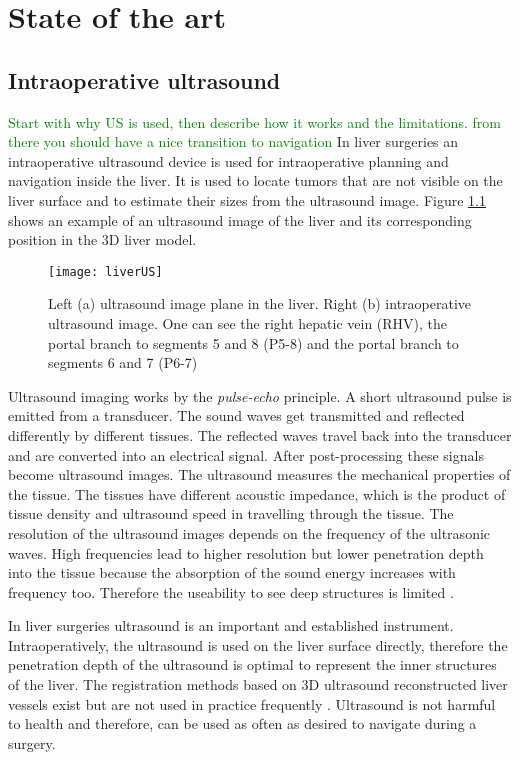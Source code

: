 \chapter{State of the art}

\section{Intraoperative ultrasound}
\textcolor{green}{Start with why US is used, then describe how it works and the limitations. from there you should have a nice transition to navigation}
In
liver surgeries an intraoperative ultrasound device is used for intraoperative planning and
navigation inside the liver. It is used to locate tumors that are not
visible on the liver surface and to estimate their sizes from the ultrasound image. Figure \ref{fig:liverUS} shows an example of an
ultrasound image of the liver and its corresponding position in the 3D liver
model.

\begin{figure}[H]
  \centering
 \texttt{[image: liverUS]}
 \caption{ Left (a) ultrasound image plane in the liver. Right (b) intraoperative
   ultrasound image. One can see the right hepatic vein (RHV), the portal branch
   to segments 5 and 8 (P5-8) and the portal branch to segments 6 and 7 (P6-7) \cite{torzilli2014ultrasound}}
  \label{fig:liverUS}
\end{figure}

Ultrasound imaging works by the \textit{pulse-echo} principle. A short
ultrasound pulse is emitted from a transducer. The sound waves get
transmitted and reflected differently by different tissues. The reflected
 waves travel back into the transducer and are converted into an electrical
signal. After post-processing these signals become ultrasound images. 
The ultrasound measures the mechanical properties of the tissue. The tissues
have different acoustic impedance, which is the product of tissue density and
ultrasound speed in travelling through the tissue. The resolution of the
ultrasound images depends on the frequency of the ultrasonic waves. High
frequencies lead to higher resolution but lower penetration depth into the tissue because the
absorption of the sound energy increases with frequency too. Therefore the
useability to see deep structures is limited \cite{torzilli2014ultrasound}. 

In liver surgeries ultrasound is an important and established instrument.
Intraoperatively, the ultrasound is used on the liver surface directly,
therefore the penetration depth of the
ultrasound is optimal to represent the inner structures of the liver.
The registration methods based on 3D ultrasound reconstructed liver vessels 
exist but are not used in practice frequently \cite{lange2003vessel}. Ultrasound
is not harmful to health and therefore, can
be used as often as desired to navigate during a surgery.

